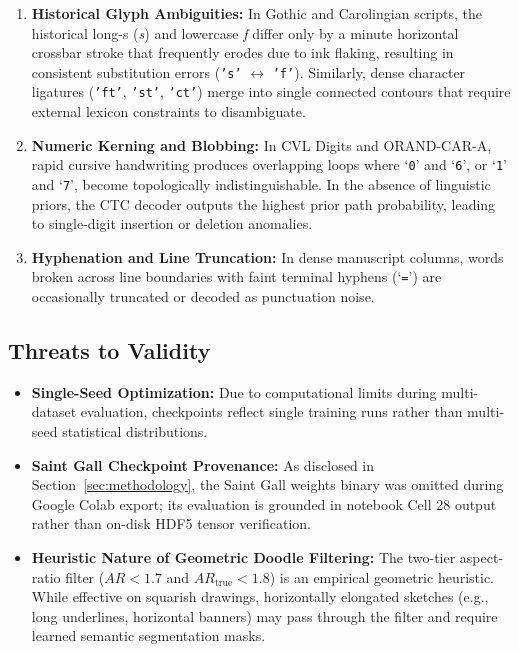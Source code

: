 \documentclass{IEEEtran}
\begin{document}
\begin{enumerate}

    \item \textbf{Historical Glyph Ambiguities:} In Gothic and Carolingian scripts, the historical long-s (\emph{s}) and lowercase \emph{f} differ only by a minute horizontal crossbar stroke that frequently erodes due to ink flaking, resulting in consistent substitution errors (\texttt{'s'} $\leftrightarrow$ \texttt{'f'}). Similarly, dense character ligatures (\texttt{'ft'}, \texttt{'st'}, \texttt{'ct'}) merge into single connected contours that require external lexicon constraints to disambiguate.

    \item \textbf{Numeric Kerning and Blobbing:} In CVL Digits and ORAND-CAR-A, rapid cursive handwriting produces overlapping loops where `\texttt{0}' and `\texttt{6}', or `\texttt{1}' and `\texttt{7}', become topologically indistinguishable. In the absence of linguistic priors, the CTC decoder outputs the highest prior path probability, leading to single-digit insertion or deletion anomalies.

    \item \textbf{Hyphenation and Line Truncation:} In dense manuscript columns, words broken across line boundaries with faint terminal hyphens (`\texttt{=}') are occasionally truncated or decoded as punctuation noise.

\end{enumerate}

\subsection{Threats to Validity}

\begin{itemize}

    \item \textbf{Single-Seed Optimization:} Due to computational limits during multi-dataset evaluation, checkpoints reflect single training runs rather than multi-seed statistical distributions.

    \item \textbf{Saint Gall Checkpoint Provenance:} As disclosed in Section~\ref{sec:methodology}, the Saint Gall weights binary was omitted during Google Colab export; its evaluation is grounded in notebook Cell 28 output rather than on-disk HDF5 tensor verification.

    \item \textbf{Heuristic Nature of Geometric Doodle Filtering:} The two-tier aspect-ratio filter ($AR < 1.7$ and $AR_{\text{true}} < 1.8$) is an empirical geometric heuristic. While effective on squarish drawings, horizontally elongated sketches (e.g., long underlines, horizontal banners) may pass through the filter and require learned semantic segmentation masks.

\end{itemize}
\end{document}
